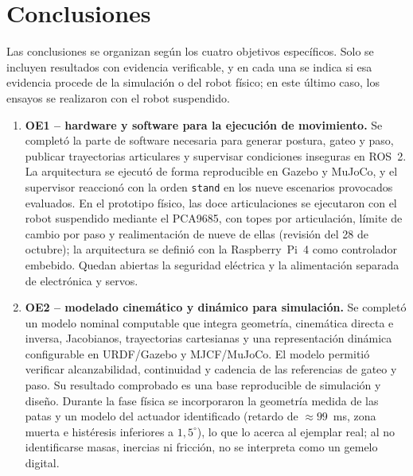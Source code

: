 \chapter{Conclusiones}

Las conclusiones se organizan según los cuatro objetivos específicos. Solo se
incluyen resultados con evidencia verificable, y en cada una se indica si esa
evidencia procede de la simulación o del robot físico; en este último caso, los
ensayos se realizaron con el robot suspendido.

\begin{enumerate}
\item \textbf{OE1 -- hardware y software para la ejecución de movimiento.}
Se completó la parte de software necesaria para generar postura, gateo y paso,
publicar trayectorias articulares y supervisar condiciones inseguras en ROS~2.
La arquitectura se ejecutó de forma reproducible en Gazebo y MuJoCo, y el
supervisor reaccionó con la orden \texttt{stand} en los nueve escenarios
provocados evaluados. En el prototipo físico, las doce articulaciones se ejecutaron con
el robot suspendido mediante el PCA9685, con topes por articulación, límite de
cambio por paso y realimentación de nueve de ellas (revisión del 28 de octubre); la arquitectura se definió
con la Raspberry~Pi~4 como controlador embebido. Quedan abiertas la seguridad
eléctrica y la alimentación separada de electrónica y servos.

\item \textbf{OE2 -- modelado cinemático y dinámico para simulación.}
Se completó un modelo nominal computable que integra geometría, cinemática
directa e inversa, Jacobianos, trayectorias cartesianas y una representación
dinámica configurable en URDF/Gazebo y MJCF/MuJoCo. El modelo permitió verificar
alcanzabilidad, continuidad y cadencia de las referencias de gateo y paso. Su
resultado comprobado es una base reproducible de simulación y diseño. Durante la
fase física se incorporaron la geometría medida de las patas y un modelo del
actuador identificado (retardo de $\approx99$~ms, zona muerta e histéresis
inferiores a $1{,}5^\circ$), lo que lo acerca al ejemplar real; al no
identificarse masas, inercias ni fricción, no se interpreta como un gemelo
digital.


\end{enumerate}
